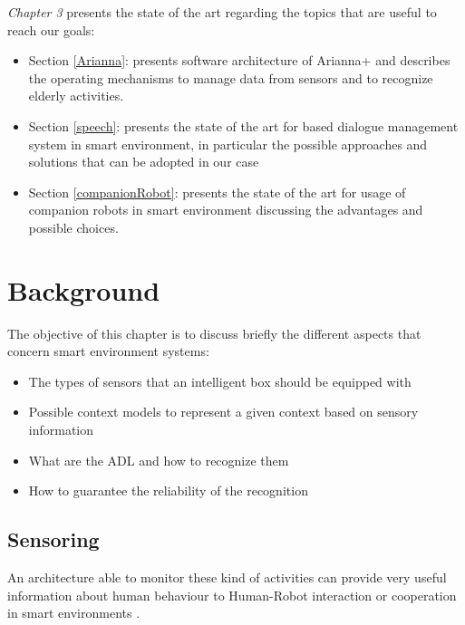 \documentclass{thesisreport}
\begin{document}
\quad \textit{Chapter 3} presents the state of the art regarding the topics that are useful to reach our goals:
\begin{itemize}
    \item Section \ref{Arianna}: presents software architecture of Arianna+ and describes the operating mechanisms to manage data from sensors and to recognize elderly activities.
    \item Section \ref{speech}: presents the state of the art for based dialogue management system in smart environment, in particular the possible approaches and solutions that can be adopted in our case
    \item Section \ref{companionRobot}: presents the state of the art for usage of companion robots in smart environment discussing the advantages and possible choices.
\end{itemize}

 \chapter{Background}
The objective of this chapter is to discuss briefly the different aspects that concern smart environment systems:
\begin{itemize}
    \item The types of sensors that an intelligent box should be equipped with
    \item Possible context models to represent a given context based on sensory information
    \item What are the ADL and how to recognize them
    \item How to guarantee the reliability of the recognition 
\end{itemize}

 \section{Sensoring}
 An architecture able to monitor these kind of activities can provide very useful information about human behaviour to Human-Robot interaction or cooperation in smart environments \cite{bruno2014public}.  
 
\end{document}
